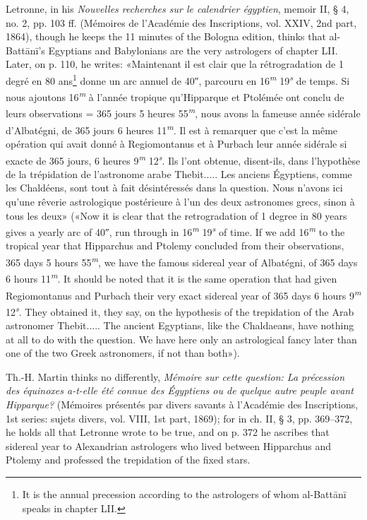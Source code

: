 \documentclass[11pt]{article}
\begin{document}
\par Letronne, in his \emph{Nouvelles recherches sur le calendrier égyptien}, memoir II, § 4, no. 2, pp. 103 ff. (Mémoires de l’Académie des Inscriptions, vol. XXIV, 2nd part, 1864), though he keeps the 11 minutes of the Bologna edition, thinks that al-Battānī's Egyptians and Babylonians are the very astrologers of chapter LII. Later, on p. 110, he writes: «Maintenant il est clair que la rétrogradation de 1 degré en 80 ans\footnote{It is the annual precession according to the astrologers of whom al-Battānī speaks in chapter LII.} donne un arc annuel de 40″, parcouru en 16\textsuperscript{\itshape m} 19\textsuperscript{\itshape s} de temps. Si nous ajoutons 16\textsuperscript{\itshape m} à l’année tropique qu’Hipparque et Ptolémée ont conclu de leurs observations = 365 jours 5 heures 55\textsuperscript{\itshape m}, nous avons la fameuse année sidérale d’Albatégni, de 365 jours 6 heures 11\textsuperscript{\itshape m}. Il est à remarquer que c’est la même opération qui avait donné à Regiomontanus et à Purbach leur année sidérale si exacte de 365 jours, 6 heures 9\textsuperscript{\itshape m} 12\textsuperscript{\itshape s}. Ils l’ont obtenue, disent-ils, dans l’hypothèse de la trépidation de l’astronome arabe Thebit..... Les anciens Égyptiens, comme les Chaldéens, sont tout à fait désintéressés dans la question. Nous n’avons ici qu’une rêverie astrologique postérieure à l’un des deux astronomes grecs, sinon à tous les deux» («Now it is clear that the retrogradation of 1 degree in 80 years gives a yearly arc of 40″, run through in 16\textsuperscript{\itshape m} 19\textsuperscript{\itshape s} of time. If we add 16\textsuperscript{\itshape m} to the tropical year that Hipparchus and Ptolemy concluded from their observations, 365 days 5 hours 55\textsuperscript{\itshape m}, we have the famous sidereal year of Albatégni, of 365 days 6 hours 11\textsuperscript{\itshape m}. It should be noted that it is the same operation that had given Regiomontanus and Purbach their very exact sidereal year of 365 days 6 hours 9\textsuperscript{\itshape m} 12\textsuperscript{\itshape s}. They obtained it, they say, on the hypothesis of the trepidation of the Arab astronomer Thebit..... The ancient Egyptians, like the Chaldaeans, have nothing at all to do with the question. We have here only an astrological fancy later than one of the two Greek astronomers, if not than both»).\par
\par Th.-H. Martin thinks no differently, \emph{Mémoire sur cette question: La précession des équinoxes a-t-elle été connue des Égyptiens ou de quelque autre peuple avant Hipparque?} (Mémoires présentés par divers savants à l’Académie des Inscriptions, 1st series: sujets divers, vol. VIII, 1st part, 1869); for in ch. II, § 3, pp. 369–372, he holds all that Letronne wrote to be true, and on p. 372 he ascribes that sidereal year to Alexandrian astrologers who lived between Hipparchus and Ptolemy and professed the trepidation of the fixed stars.\par
\end{document}
